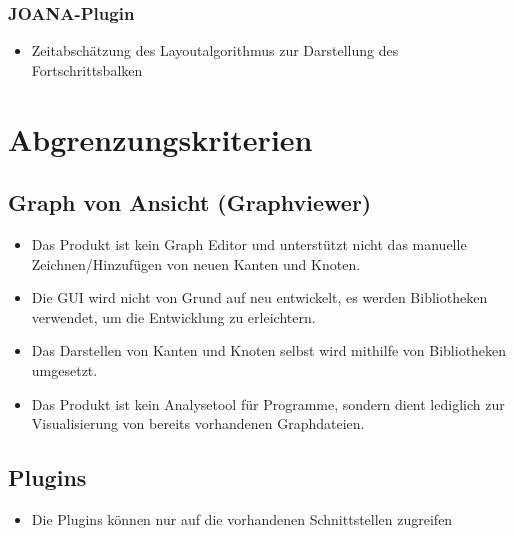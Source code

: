   \subsubsection{JOANA-Plugin}
  \begin{itemize}
    \item Zeitabschätzung des Layoutalgorithmus zur Darstellung des Fortschrittsbalken
  \end{itemize}


\section{Abgrenzungskriterien}

\subsection{Graph von Ansicht (Graphviewer)}
  \begin{itemize}
    \item Das Produkt ist kein Graph Editor und unterstützt nicht das manuelle Zeichnen/Hinzufügen von neuen Kanten und Knoten.
    \item Die GUI wird nicht von Grund auf neu entwickelt, es werden Bibliotheken verwendet, um die Entwicklung zu erleichtern.
    \item Das Darstellen von Kanten und Knoten selbst wird mithilfe von Bibliotheken umgesetzt.
    \item Das Produkt ist kein Analysetool für Programme, sondern dient lediglich zur Visualisierung von bereits vorhandenen Graphdateien.
  \end{itemize}
\subsection{Plugins}
  \begin{itemize}
    \item Die Plugins können nur auf die vorhandenen Schnittstellen zugreifen %
  \end{itemize}
